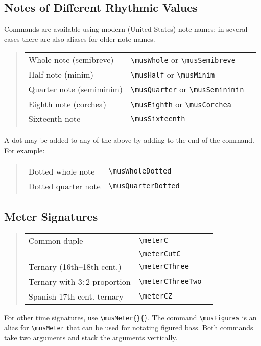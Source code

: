 \documentclass{article}
\newenvironment{codetable}
{\begin{quote}\begin{tabular}{lll}}
{\end{tabular}\end{quote}}
\begin{document}
\subsection{Notes of Different Rhythmic Values}

Commands are available using modern (United States) note names; in several cases
there are also aliases for older note names.

\begin{codetable}
    Whole note (semibreve) & \verb|\musWhole| or \verb|\musSemibreve| &
    \musWhole\\
    Half note (minim) & \verb|\musHalf| or \verb|\musMinim| & \musHalf\\
    Quarter note (semiminim) & \verb|\musQuarter| or \verb|\musSeminimin| &
    \musQuarter\\
    Eighth note (corchea) & \verb|\musEighth| or \verb|\musCorchea| &
    \musEighth\\
    Sixteenth note & \verb|\musSixteenth| & \musSixteenth\\
\end{codetable}

A dot may be added to any of the above by adding  to the end of the
command. For example:

\begin{codetable}
    Dotted whole note & \verb|\musWholeDotted| & \musWholeDotted\\
    Dotted quarter note & \verb|\musQuarterDotted| & \musQuarterDotted\\
\end{codetable}

\subsection{Meter Signatures}

\begin{codetable}
    Common duple & \verb|\meterC| & \meterC\\
    \term{Alla breve} & \verb|\meterCutC| & \meterCutC\\
    Ternary (16th--18th cent.) & \verb|\meterCThree| & \meterCThree\\
    Ternary with $3:2$ proportion & \verb|\meterCThreeTwo| &
    \meterCThreeTwo\\
    Spanish 17th-cent. ternary & \verb|\meterCZ| & \meterCZ\\
\end{codetable}

For other time signatures, use \verb|\musMeter{}{}|. 
The command \verb|\musFigures| is an alias for \verb|\musMeter| that can be used
for notating figured bass. 
Both commands take two arguments and stack the arguments vertically.
\end{document}
